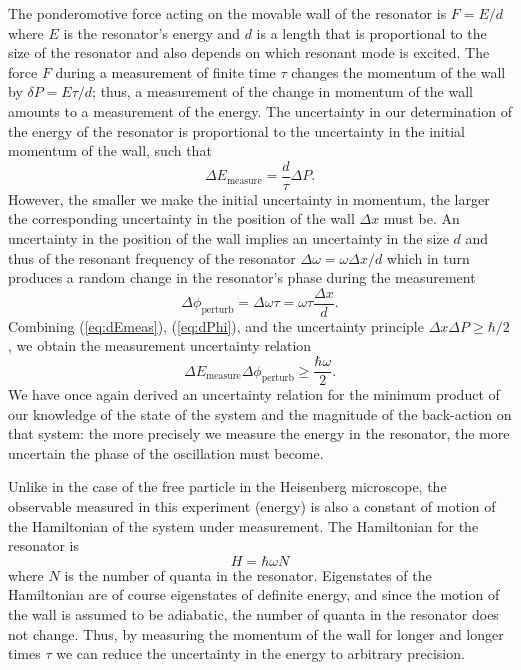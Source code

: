 The ponderomotive force acting on the movable wall of the resonator is $F = E/d$ where $E$ is the resonator's energy and $d$ is a length that is proportional to the size of the resonator and also depends on which resonant mode is excited.  The force $F$ during a measurement of finite time $\tau$ changes the momentum of the wall by $\delta P = E \tau / d$; thus, a measurement of the change in momentum of the wall amounts to a measurement of the energy.  The uncertainty in our determination of the energy of the resonator is proportional to the uncertainty in the initial momentum of the wall, such that
\begin{equation}
\Delta E_{\textrm{measure}} = \frac{d}{\tau} \Delta P.
\label{eq:dEmeas}
\end{equation}
However, the smaller we make the initial uncertainty in momentum, the larger the corresponding uncertainty in the position of the wall $\Delta x$ must be.  An uncertainty in the position of the wall implies an uncertainty in the size $d$ and thus of the resonant frequency of the resonator $\Delta \omega = \omega \Delta x / d$ which in turn produces a random change in the resonator's phase during the measurement
\begin{equation}
\Delta \phi_{\textrm{perturb}} = \Delta \omega \tau = \omega \tau \frac{\Delta x}{d}.
\label{eq:dPhi}
\end{equation}
Combining (\ref{eq:dEmeas}), (\ref{eq:dPhi}), and the uncertainty principle $\Delta x \Delta P \geq \hbar/2$, we obtain the measurement uncertainty relation
\begin{equation}
\Delta E_{\textrm{measure}} \Delta \phi_{\textrm{perturb}} \geq \frac{\hbar \omega}{2}.
\label{eq:dEmeasdPhi}
\end{equation}
We have once again derived an uncertainty relation for the minimum product of our knowledge of the state of the system and the magnitude of the back-action on that system: the more precisely we measure the energy in the resonator, the more uncertain the phase of the oscillation must become.

Unlike in the case of the free particle in the Heisenberg microscope, the observable measured in this experiment (energy) is also a constant of motion of the Hamiltonian of the system under measurement.  The Hamiltonian for the resonator is
\begin{equation}
H = \hbar \omega N
\label{eq:Hres}
\end{equation}
where $N$ is the number of quanta in the resonator.  Eigenstates of the Hamiltonian are of course eigenstates of definite energy, and since the motion of the wall is assumed to be adiabatic, the number of quanta in the resonator does not change.  Thus, by measuring the momentum of the wall for longer and longer times $\tau$ we can reduce the uncertainty in the energy to arbitrary precision.

